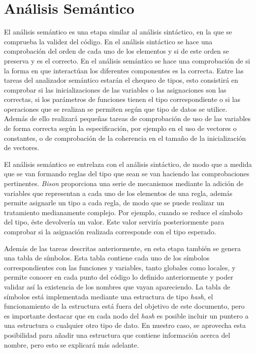 \documentclass[a4paper,10pt]{article}
\begin{document}
\section{Análisis Semántico}
El análisis semántico es una etapa similar al análisis sintáctico, en la que se comprueba la validez del código. En el análisis sintáctico se hace una comprobación del orden de cada uno de los elementos y si de este orden se preserva y es el correcto. En el análisis semántico se hace una comprobación de si la forma en que interactúan los diferentes componentes es la correcta. Entre las tareas del analizador semántico estarán el chequeo de tipos, esto consistirá en comprobar si las inicializaciones de las variables o las asignaciones son las correctas, si los parámetros de funciones tienen el tipo correspondiente o si las operaciones que se realizan se permiten según que tipo de datos se utilice. Además de ello realizará pequeñas tareas de comprobación de uso de las variables de forma correcta según la especificación, por ejemplo en el uso de vectores o constantes, o de comprobación de la coherencia en el tamaño de la inicialización de vectores.

El análisis semántico se entrelaza con el análisis sintáctico, de modo que a medida que se van formando reglas del tipo que sean se van haciendo las comprobaciones pertinentes. \textit{Bison} proporciona una serie de mecanismos mediante la adición de variables que representan a cada uno de los elementos de una regla, además permite asignarle un tipo a cada regla, de modo que se puede realizar un tratamiento medianamente complejo. Por ejemplo, cuando se reduce el símbolo del tipo, éste devolvería un valor. Este valor serviría posteriormente para comprobar si la asignación realizada corresponde con el tipo esperado.

Además de las tareas descritas anteriormente, en esta etapa también se genera una tabla de símbolos. Esta tabla contiene cada uno de los símbolos correspondientes con las funciones y variables, tanto globales como locales, y permite conocer en cada punto del código lo definido anteriormente y poder validar así la existencia de los nombres que vayan apareciendo. La tabla de símbolos está implementada mediante una estructura de tipo \textit{hash}, el funcionamiento de la estructura está fuera del objetivo de este documento, pero es importante destacar que en cada nodo del \textit{hash} es posible incluir un puntero a una estructura o cualquier otro tipo de dato. En nuestro caso, se aprovecha esta posibilidad para añadir una estructura que contiene información acerca del nombre, pero esto se explicará más adelante.
\end{document}
